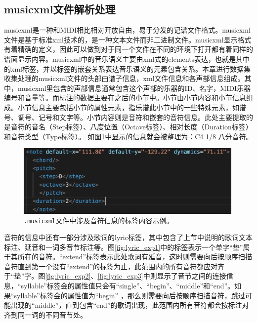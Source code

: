 \subsection{musicxml文件解析处理}
musicxml是一种和MIDI相比相对开放自由，易于分发的记谱文件格式。musicxml文件是基于标准xml技术的，是一种文本文件而非二进制文件。musicxml显示格式有着精确的定义，因此可以做到对于同一个文件在不同的环境下打开都有着同样的谱面显示内容。musicxml中的音乐语义主要由xml式的elements表达，也就是其中的xml标签，并以标签的嵌套关系表达音乐语义的元素包含关系。本章进行数据集收集处理的musicxml文件的头部由谱子信息，xml文件信息和各声部信息组成。其中，musicxml里包含的声部信息通常包含这个声部的乐器的ID、名字，MIDI乐器编号和音量等。而标注的数据主要在之后的小节中。小节由小节内容和小节信息组成。小节信息主要包括小节的属性元素，指乐谱此小节中的一些特殊元素，如谱号、调号、记号和文字等。小节内容则是音符和嵌套的音符信息。此处主要提取的是音符的音名（Step标签）、八度位置（Octave标签）、相对长度（Duration标签）和音符类型（Type标签）。
如图\ref{fig:musicxml_exp}中显示的信息就会被整理为：C4 1/8 八分音符。
\begin{figure}[!ht]
    \centering
    \includegraphics[width=0.99\textwidth]{figure/ast/musicxml_exp.png}
    \caption{\texttt{.musicxml}文件中涉及音符信息的标签内容示例。}
    \label{fig:musicxml_exp}
\end{figure}
音符的信息中还有一部分涉及歌词的lyric标签，其中包含了上节中说明的歌词文本标注、延音和一词多音节标注等。图\ref{fig:lyric_exp1}中的标签表示一个单字``垫''属于其所在的音符。``extend''标签表示此处歌词有延音，这时则需要向后按顺序扫描音符直到第一个没有``extend''的标签为止，此范围内的所有音符都应对齐于``垫''字。图\ref{fig:lyric_exp2}、\ref{fig:lyric_exp3}中则显示了音节之间的连接信息，``syllable''标签会的属性值只会有``single''、``begin''、``middle''和``end''。如果``syllable''标签会的属性值为``begin''
，那么则需要向后按顺序扫描音符，跳过可能出现的``middle''，直到包含``end''的歌词出现，此范围内所有音符都会按标注对齐到同一词的不同音节处。
